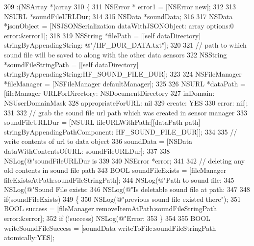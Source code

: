 \begin{DoxyCode}
309                   :(NSArray *)array
310 \{
311     NSError * error1 = [NSError new];
312     
313     NSURL *soundFileURLDur;
314     
315     NSData *soundData;
316     
317     NSData *jsonObject = [NSJSONSerialization dataWithJSONObject: array options:0 error:&error1];
318 
319     NSString *filePath = [[\textcolor{keyword}{self} dataDirectory] stringByAppendingString: @"/HF\_DUR\_DATA.txt"];
320     
321     \textcolor{comment}{// path to which sound file will be saved to along with the other data sensors}
322     NSString *soundFileStringPath = [[\textcolor{keyword}{self} dataDirectory] stringByAppendingString:HF\_SOUND\_FILE\_DUR];
323     
324     NSFileManager *fileManager = [NSFileManager defaultManager];
325     
326     NSURL *dataPath = [fileManager URLForDirectory: NSDocumentDirectory
327                                           inDomain: NSUserDomainMask
328                                  appropriateForURL: nil
329                                             create: YES
330                                              error: nil];
331     
332     \textcolor{comment}{// grab the sound file url path which was created in sensor manager}
333     soundFileURLDur = [NSURL fileURLWithPath:[[dataPath path] stringByAppendingPathComponent:
      HF\_SOUND\_FILE\_DUR]];
334     
335     \textcolor{comment}{// write contents of url to data object}
336     soundData = [NSData dataWithContentsOfURL: soundFileURLDur];
337     
338     NSLog(\textcolor{stringliteral}{@"soundFileURLDur is %
339  
340     NSError *error;
341     
342     \textcolor{comment}{// deleting any old contents in sound file path}
343     BOOL soundFileExists = [fileManager fileExistsAtPath:soundFileStringPath];
344     NSLog(\textcolor{stringliteral}{@"Path to sound file: %
345     NSLog(\textcolor{stringliteral}{@"Sound File exists: %
346     NSLog(\textcolor{stringliteral}{@"Is deletable sound file at path: %
347     
348     \textcolor{keywordflow}{if}(soundFileExists)
349     \{
350         NSLog(\textcolor{stringliteral}{@"previous sound file existed there"});
351         BOOL success = [fileManager removeItemAtPath:soundFileStringPath error:&error];
352         \textcolor{keywordflow}{if} (!success) NSLog(\textcolor{stringliteral}{@"Error: %
353     \}
354     
355     BOOL writeSoundFileSuccess = [soundData writeToFile:soundFileStringPath atomically:YES];
}}}}}
\end{DoxyCode}
